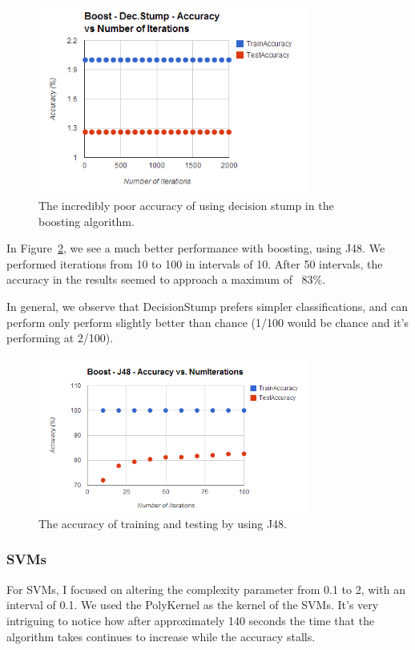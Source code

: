 \documentclass[annual]{acmsiggraph}
\begin{document}
\begin{figure}[ht]
  \centering
  \includegraphics[width=3.5in]{charts/chart_1_boost_d2.PNG}
  \caption{The incredibly poor accuracy of using decision stump in the boosting
  algorithm.}
  \label{fig:boost1d2}
\end{figure}

In Figure~\ref{fig:boost2d2}, we see a much better performance with boosting,
using J48. We performed iterations from 10 to 100 in intervals of 10. After 50
intervals, the accuracy in the results seemed to approach a maximum of ~83\%.

In general, we observe that DecisionStump prefers simpler classifications, and
can perform only perform slightly better than chance (1/100 would be chance and
it's performing at 2/100).

\begin{figure}[ht]
  \centering
  \includegraphics[width=3.5in]{charts/chart_2_boost_d2.PNG}
  \caption{The accuracy of training and testing by using J48.}
  \label{fig:boost2d2}
\end{figure}

\subsubsection{SVMs}

For SVMs, I focused on altering the complexity parameter from 0.1 to 2, with an
interval of 0.1. We used the PolyKernel as the kernel of the SVMs. It's very
intriguing to notice how after approximately 140 seconds the time that the
algorithm takes continues to increase while the accuracy stalls. 
\end{document}
